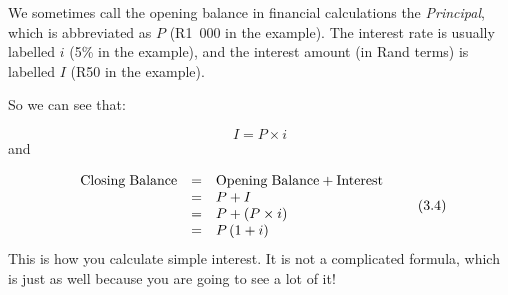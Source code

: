       \label{m39332*id69469}We sometimes call the opening balance in financial calculations the \textsl{Principal}, which is abbreviated as $P$ (R1~000 in the example). The interest rate is usually labelled $i$ (5\% in the example), and the interest amount (in Rand terms) is labelled $I$ (R50 in the example).\par 
      \label{m39332*id69507}So we can see that:\par 
      \label{m39332*uid28}\nopagebreak\noindent{}
        
    \begin{equation}
    I=P\ensuremath{\times}i\tag{3.3}
      \end{equation}
      \label{m39332*id69536}and\par 
      \label{m39332*id69539}\nopagebreak\noindent{}
    \begin{equation}
    \begin{array}{ccc}\hfill \mathrm{Closing\; Balance}& =& \mathrm{Opening\; Balance}+\mathrm{Interest}\hfill \\ & =& P+I\hfill \\ & =& P+\left(P\ensuremath{\times}i\right)\hfill \\ & =& P\left(1+i\right)\hfill \end{array}\tag{3.4}
      \end{equation}
      \label{m39332*id69642}This is how you calculate simple interest. It is not a complicated formula, which is just as well because you are going to see a lot of it!\par 
      \label{m39332*uid29}
